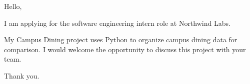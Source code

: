 \documentclass[11pt]{article}
\begin{document}
Hello,

I am applying for the software engineering intern role at Northwind Labs.

My Campus Dining project uses Python to organize campus dining data for comparison. I would welcome the opportunity to discuss this project with your team.

Thank you.
\end{document}
